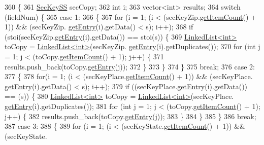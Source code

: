 \begin{DoxyCode}
360                                                        \{
361     \hyperlink{classSecKeySS}{SecKeySS} secCopy;
362     \textcolor{keywordtype}{int} i;
363     vector<int> results;
364     \textcolor{keywordflow}{switch} (fieldNum) \{
365     \textcolor{keywordflow}{case} 1:
366     \{
367         \textcolor{keywordflow}{for} (i = 1; (i < (secKeyZip.\hyperlink{classLinkedList_afc6635f854f48f2f126cf3b60d845220}{getItemCount}() + 1)) && (secKeyZip.
      \hyperlink{classLinkedList_a341bfd7772c9d24d29eb7a7f3936915b}{getEntry}(i).getData() < s); i++);
368         \textcolor{keywordflow}{if} (stoi(secKeyZip.\hyperlink{classLinkedList_a341bfd7772c9d24d29eb7a7f3936915b}{getEntry}(i).getData()) == stoi(s)) \{
369             \hyperlink{classLinkedList}{LinkedList<int>} toCopy = \hyperlink{classLinkedList}{LinkedList<int>}(secKeyZip.
      \hyperlink{classLinkedList_a341bfd7772c9d24d29eb7a7f3936915b}{getEntry}(i).getDuplicates());
370             \textcolor{keywordflow}{for} (\textcolor{keywordtype}{int} j = 1; j < (toCopy.\hyperlink{classLinkedList_afc6635f854f48f2f126cf3b60d845220}{getItemCount}() + 1); j++) \{
371                 results.push\_back(toCopy.\hyperlink{classLinkedList_a341bfd7772c9d24d29eb7a7f3936915b}{getEntry}(j));
372             \}
373         \}
374     \}
375     \textcolor{keywordflow}{break};
376     \textcolor{keywordflow}{case} 2:
377     \{
378         \textcolor{keywordflow}{for}(i = 1; (i < (secKeyPlace.\hyperlink{classLinkedList_afc6635f854f48f2f126cf3b60d845220}{getItemCount}() + 1)) && (secKeyPlace.
      \hyperlink{classLinkedList_a341bfd7772c9d24d29eb7a7f3936915b}{getEntry}(i).getData() < s); i++);
379         \textcolor{keywordflow}{if} ((secKeyPlace.\hyperlink{classLinkedList_a341bfd7772c9d24d29eb7a7f3936915b}{getEntry}(i).getData()) == (s)) \{
380             \hyperlink{classLinkedList}{LinkedList<int>} toCopy = \hyperlink{classLinkedList}{LinkedList<int>}(secKeyPlace.
      \hyperlink{classLinkedList_a341bfd7772c9d24d29eb7a7f3936915b}{getEntry}(i).getDuplicates());
381             \textcolor{keywordflow}{for} (\textcolor{keywordtype}{int} j = 1; j < (toCopy.\hyperlink{classLinkedList_afc6635f854f48f2f126cf3b60d845220}{getItemCount}() + 1); j++) \{
382                 results.push\_back(toCopy.\hyperlink{classLinkedList_a341bfd7772c9d24d29eb7a7f3936915b}{getEntry}(j));
383             \}
384         \}
385     \}
386     \textcolor{keywordflow}{break};
387     \textcolor{keywordflow}{case} 3:
388     \{
389         \textcolor{keywordflow}{for} (i = 1; (i < (secKeyState.\hyperlink{classLinkedList_afc6635f854f48f2f126cf3b60d845220}{getItemCount}() + 1)) && (secKeyState.

\end{DoxyCode}

